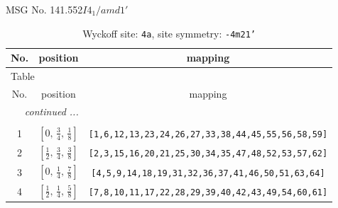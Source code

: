 \documentclass[fleqn,8pt]{jsarticle}
\begin{document}
\setcounter{MaxMatrixCols}{32}

\renewcommand{\tablename}{Table~}
\renewcommand{\figurename}{Figure~}
\begin{center}
\LARGE
MSG No. 141.552\quad$I4_{1}/amd1'$
\end{center}
\renewcommand{\arraystretch}{1.2}
\begin{longtable}{ccc}
\caption{Wyckoff site: {\tt 4a}, site symmetry: {\tt -4m21'}}
 \\
 \hline \hline
No. & position & mapping \\ \hline \endfirsthead

\multicolumn{2}{l}{\tablename\ \thetable{}} \\
 \hline \hline
No. & position & mapping \\ \hline \endhead

 \hline \hline
\multicolumn{2}{r}{\footnotesize\it continued ...} \\ \endfoot

 \hline \hline
\multicolumn{2}{r}{} \\ \endlastfoot

1 & $\left[ 0,\, \frac{3}{4},\, \frac{1}{8} \right]$ & {\tt [1,6,12,13,23,24,26,27,33,38,44,45,55,56,58,59]} \\ \hline
2 & $\left[ \frac{1}{2},\, \frac{3}{4},\, \frac{3}{8} \right]$ & {\tt [2,3,15,16,20,21,25,30,34,35,47,48,52,53,57,62]} \\ \hline
3 & $\left[ 0,\, \frac{1}{4},\, \frac{7}{8} \right]$ & {\tt [4,5,9,14,18,19,31,32,36,37,41,46,50,51,63,64]} \\ \hline
4 & $\left[ \frac{1}{2},\, \frac{1}{4},\, \frac{5}{8} \right]$ & {\tt [7,8,10,11,17,22,28,29,39,40,42,43,49,54,60,61]} \\
\end{longtable}
\renewcommand{\arraystretch}{1.2}
\end{document}
